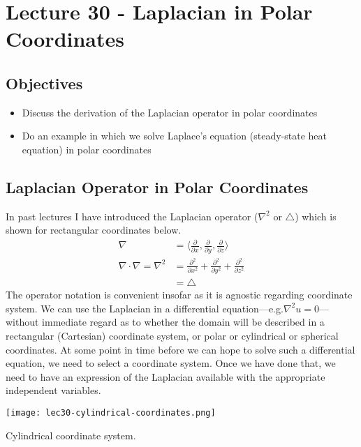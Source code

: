 \chapter{Lecture 30 - Laplacian in Polar Coordinates}
\label{ch:lec30}
\section{Objectives}
\begin{itemize}
\item Discuss the derivation of the Laplacian operator in polar coordinates
\item Do an example in which we solve Laplace's equation (steady-state heat equation) in polar coordinates
\end{itemize}
\setcounter{lstannotation}{0}

\section{Laplacian Operator in Polar Coordinates}

In past lectures I have introduced the Laplacian operator ($\nabla^2$ or $\bigtriangleup$) which is shown for rectangular coordinates below.
\begin{align*}
\nabla &= \langle \frac{\partial}{\partial x}, \frac{\partial}{\partial y}, \frac{\partial}{\partial z} \rangle \\
\nabla \cdot \nabla = \nabla^2 &= \frac{\partial^2}{\partial x^2} + \frac{\partial^2}{\partial y^2} + \frac{\partial^2}{\partial z^2} \\
&= \bigtriangleup
\end{align*}
The operator notation is convenient insofar as it is agnostic regarding coordinate system.  We can use the Laplacian in a differential equation---e.g.$\nabla^2u = 0$---without immediate regard as to whether the domain will be described in a rectangular (Cartesian) coordinate system, or polar or cylindrical or spherical coordinates.  At some point in time before we can hope to solve such a differential equation, we need to select a coordinate system.  Once we have done that, we need to have an expression of the Laplacian available with the appropriate independent variables.  
\begin{marginfigure}
\texttt{[image: lec30-cylindrical-coordinates.png]}
\caption{Cylindrical coordinate system.}
\label{fig:lec30-cylindrical-coordinates}
\end{marginfigure}

